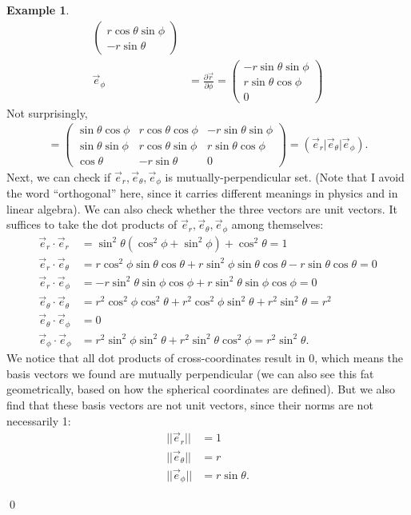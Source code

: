 \documentclass{book}
\theoremstyle{definition}
\newtheorem{exmp}{Example}[section]
\begin{document}
\begin{exmp}
\begin{align*}
\begin{pmatrix}
r\cos\theta\sin\phi\\
-r\sin\theta
\end{pmatrix}\\
\vec{e}_\phi &= \frac{\partial \vec{r}}{\partial \phi}=
\begin{pmatrix}
-r\sin\theta\sin\phi\\
r\sin\theta\cos\phi\\
0
\end{pmatrix}
\end{align*} 
Not surprisingly,
\begin{align*}
[U^{j'}_i] = 
\begin{pmatrix}
\sin\theta\cos\phi & r\cos\theta\cos\phi & -r\sin\theta\sin\phi \\
\sin\theta\sin\phi & r\cos\theta\sin\phi & r\sin\theta\cos\phi \\
\cos\theta & -r\sin\theta & 0
\end{pmatrix}
=
\left( \vec{e}_r \vert \vec{e}_\theta \vert \vec{e}_\phi \right).
\end{align*}
Next, we can check if ${\vec{e}_r, \vec{e}_\theta, \vec{e}_\phi}$ is mutually-perpendicular set. (Note that I avoid the word ``orthogonal'' here, since it carries different meanings in physics and in linear algebra). We can also check whether the three vectors are unit vectors. It suffices to take the dot products of ${\vec{e}_r, \vec{e}_\theta, \vec{e}_\phi}$ among themselves:
\begin{align*}
\vec{e}_r\cdot\vec{e}_r &= \sin^2\theta(\cos^2\phi + \sin^2\phi) + \cos^2\theta = 1\\
\vec{e}_r\cdot\vec{e}_\theta &= r\cos^2\phi\sin\theta\cos\theta + r\sin^2\phi\sin\theta\cos\theta - r\sin\theta\cos\theta = 0\\
\vec{e}_r\cdot\vec{e}_\phi &= -r\sin^2\theta\sin\phi\cos\phi + r\sin^2\theta\sin\phi\cos\phi = 0\\ 
\vec{e}_\theta\cdot\vec{e}_\theta &= r^2\cos^2\phi\cos^2\theta + r^2\cos^2\phi\sin^2\theta + r^2\sin^2\theta = r^2\\ 
\vec{e}_\theta\cdot\vec{e}_\phi &= 0 \\
\vec{e}_\phi\cdot\vec{e}_\phi &= r^2\sin^2\phi\sin^2\theta + r^2\sin^2\theta\cos^2\phi = r^2\sin^2\theta.
\end{align*}
We notice that all dot products of cross-coordinates result in 0, which means the basis vectors we found are mutually perpendicular (we can also see this fat geometrically, based on how the spherical coordinates are defined). But we also find that these basis vectors are not unit vectors, since their norms are not necessarily 1:
\begin{align*}
\vert\vert \vec{e}_r \vert\vert &= 1\\
\vert\vert \vec{e}_\theta \vert\vert &= r\\
\vert\vert \vec{e}_\phi \vert\vert &= r\sin\theta.
\end{align*}
\end{exmp}\qed
\end{document}
